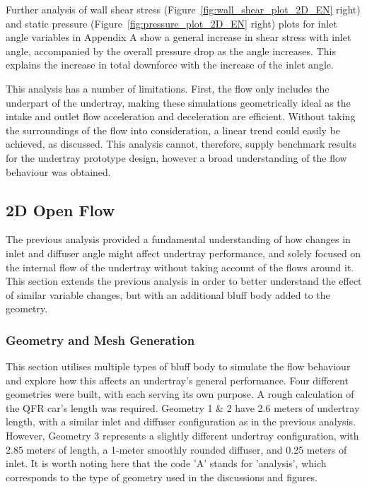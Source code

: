 \noindent Further analysis of wall shear stress (Figure~\ref{fig:wall_shear_plot_2D_EN} right) and static pressure (Figure~\ref{fig:pressure_plot_2D_EN} right) plots for inlet angle variables in Appendix A show a general increase in shear stress with inlet angle, accompanied by the overall pressure drop as the angle increases. This explains the increase in total downforce with the increase of the inlet angle.

\noindent This analysis has a number of limitations. First, the flow only includes the underpart of the undertray, making these simulations geometrically ideal as the intake and outlet flow acceleration and deceleration are efficient. Without taking the surroundings of the flow into consideration, a linear trend could easily be achieved, as discussed. This analysis cannot, therefore, supply benchmark results for the undertray prototype design, however a broad understanding of the flow behaviour was obtained.



\subsection{2D Open Flow}
The previous analysis provided a fundamental understanding of how changes in inlet and diffuser angle might affect undertray performance, and solely focused on the internal flow of the undertray without taking account of the flows around it. This section extends the previous analysis in order to better understand the effect of similar variable changes, but with an additional bluff body added to the geometry. 

\subsubsection{Geometry and Mesh Generation}
This section utilises multiple types of bluff body to simulate the flow behaviour and explore how this affects an undertray's general performance. Four different geometries were built, with each serving its own purpose. A rough calculation of the QFR car's length was required. Geometry 1 \& 2 have 2.6 meters of undertray length, with a similar inlet and diffuser configuration as in the previous analysis. However, Geometry 3 represents a slightly different undertray configuration, with 2.85 meters of length, a 1-meter smoothly rounded diffuser, and 0.25 meters of inlet. It is worth noting here that the code 'A' stands for 'analysis', which corresponds to the type of geometry used in the discussions and figures.

